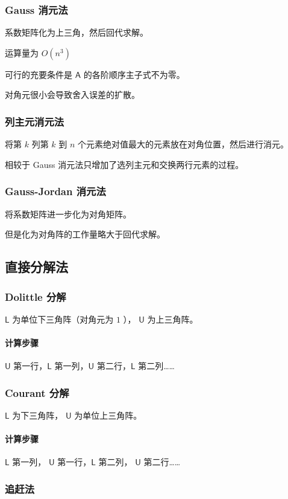 \documentclass[a4paper,12pt]{article}
\begin{document}
\subsubsection{Gauss 消元法}
系数矩阵化为上三角，然后回代求解。\par
运算量为 $O(n^3)$\par
可行的充要条件是 $\mathsf{A}$ 的各阶顺序主子式不为零。\par
对角元很小会导致舍入误差的扩散。
\subsubsection{列主元消元法}
将第 $k$ 列第 $k$ 到 $n$ 个元素绝对值最大的元素放在对角位置，然后进行消元。\par
相较于 Gauss 消元法只增加了选列主元和交换两行元素的过程。
\subsubsection{Gauss-Jordan 消元法}
将系数矩阵进一步化为对角矩阵。\par
但是化为对角阵的工作量略大于回代求解。
\subsection{直接分解法}
\subsubsection{Dolittle 分解}
$\mathsf{L}$ 为单位下三角阵（对角元为 $1$ ）， $\mathsf{U}$ 为上三角阵。\par
\paragraph{计算步骤}
$\mathsf{U}$ 第一行，$\mathsf{L}$ 第一列，$\mathsf{U}$ 第二行，$\mathsf{L}$ 第二列……
\subsubsection{Courant 分解}
$\mathsf{L}$ 为下三角阵， $\mathsf{U}$ 为单位上三角阵。\par
\paragraph{计算步骤}
$\mathsf{L}$ 第一列， $\mathsf{U}$ 第一行，$\mathsf{L}$ 第二列， $\mathsf{U}$ 第二行……
\subsubsection{追赶法}
\end{document}
